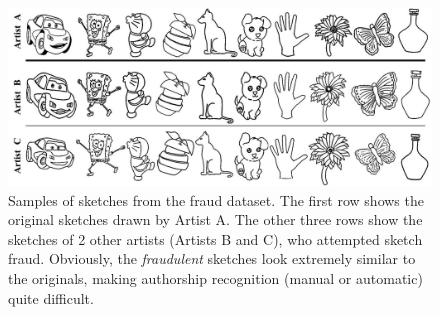 \begin{figure}[htbp!]
\centering
\includegraphics[width = 1.0\textwidth]{images/fraudExperiment.jpg}
\vspace{-6mm}\caption {Samples of sketches from the fraud dataset. The first row shows the original sketches drawn by Artist A. The other three rows show the sketches of 2 other artists (Artists B and C), who attempted  sketch fraud. Obviously, the \emph{fraudulent} sketches look extremely similar to the originals, making authorship recognition (manual or automatic) quite difficult.}\vspace{-5mm}
\label{FraudDataset}
\end{figure}



